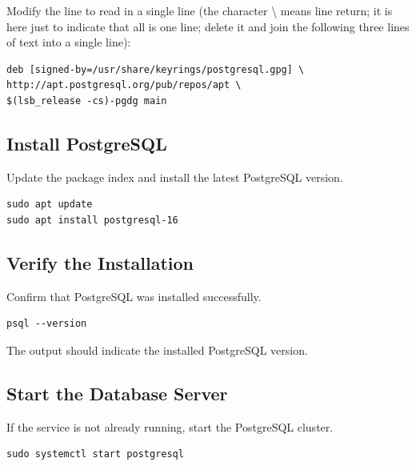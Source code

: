 Modify the line to read in a single line (the character \textbackslash{}  means line return; it is here just to indicate that all is one line; delete it and join the following three lines of text into a single line):

\begin{lstlisting}[basicstyle=\footnotesize\ttfamily]
deb [signed-by=/usr/share/keyrings/postgresql.gpg] \
http://apt.postgresql.org/pub/repos/apt \
$(lsb_release -cs)-pgdg main
\end{lstlisting}

\subsection{Install PostgreSQL}
Update the package index and install the latest PostgreSQL version.

\begin{lstlisting}[basicstyle=\footnotesize\ttfamily]
sudo apt update
sudo apt install postgresql-16
\end{lstlisting}

\subsection{Verify the Installation}
Confirm that PostgreSQL was installed successfully.

\begin{lstlisting}[basicstyle=\footnotesize\ttfamily]
psql --version
\end{lstlisting}

The output should indicate the installed PostgreSQL version.

\subsection{Start the Database Server}
If the service is not already running, start the PostgreSQL cluster.

\begin{lstlisting}[basicstyle=\footnotesize\ttfamily]
sudo systemctl start postgresql
\end{lstlisting}

